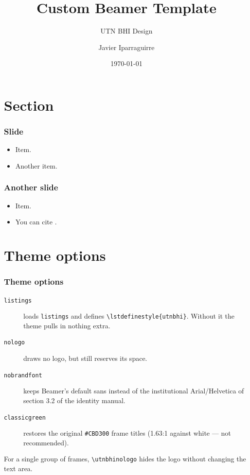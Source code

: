 \documentclass[aspectratio=169]{beamer}
\title[]{Custom Beamer Template}
\subtitle{UTN BHI Design}
\author[J. Iparraguirre] {Javier Iparraguirre}
\institute{
Universidad Tecnológica Nacional\\
11 de abril 461, Bahía Blanca, Argentina\\
\email\\
\url{http://www.frbb.utn.edu.ar/}}
\date{\today}
\begin{document}
\begin{frame}
  \titlepage
\end{frame}

\section{Section}
\begin{frame}
  \frametitle{Slide}
  \begin{itemize}
    \item Item.
    \item Another item.
  \end{itemize}
\end{frame}

\begin{frame}
  \frametitle{Another slide}
  \begin{itemize}
    \item Item.
    \item You can cite \cite{iparraguirre2013speeded}.
  \end{itemize}
\end{frame}

\section{Theme options}
\begin{frame}
  \frametitle{Theme options}
  \small
  \begin{description}
    \item[\texttt{listings}] loads \texttt{listings} and defines
      \texttt{\textbackslash lstdefinestyle\{utnbhi\}}. Without it the theme
      pulls in nothing extra.
    \item[\texttt{nologo}] draws no logo, but still reserves its space.
    \item[\texttt{nobrandfont}] keeps Beamer's default sans instead of the
      institutional Arial/Helvetica of section 3.2 of the identity manual.
    \item[\texttt{classicgreen}] restores the original \texttt{\#CBD300}
      frame titles (1.63:1 against white --- not recommended).
  \end{description}
  \vfill
  For a single group of frames, \texttt{\textbackslash utnbhinologo} hides the
  logo without changing the text area.
\end{frame}
\end{document}

